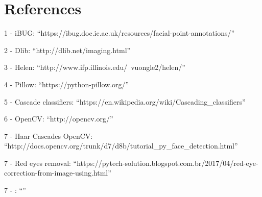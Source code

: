 \documentclass[12pt,a4paper]{article}
\begin{document}
    

\section{References}

1 - iBUG: ``https://ibug.doc.ic.ac.uk/resources/facial-point-annotations/''\\
\par 2 - Dlib: ``http://dlib.net/imaging.html''\\
\par 3 - Helen: ``http://www.ifp.illinois.edu/~vuongle2/helen/'' \\
\par 4 - Pillow: ``https://python-pillow.org/'' \\
\par 5 - Cascade classifiers: ``https://en.wikipedia.org/wiki/Cascading_classifiers'' \\
\par 6 - OpenCV: ``http://opencv.org/'' \\
\par 7 - Haar Cascades OpenCV: ``http://docs.opencv.org/trunk/d7/d8b/tutorial_py_face_detection.html'' \\


\par 7 - Red eyes removal: ``https://pytech-solution.blogspot.com.br/2017/04/red-eye-correction-from-image-using.html'' \\ %
\par 7 - : ``'' \\
\end{document}
